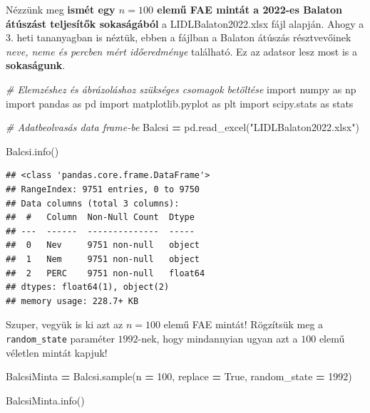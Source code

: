 \documentclass[
]{book}
\newenvironment{Shaded}{\begin{snugshade}}{\end{snugshade}}
\newcommand{\CommentTok}[1]{\textcolor[rgb]{0.56,0.35,0.01}{\textit{#1}}}
\newcommand{\DecValTok}[1]{\textcolor[rgb]{0.00,0.00,0.81}{#1}}
\newcommand{\ImportTok}[1]{#1}
\newcommand{\NormalTok}[1]{#1}
\newcommand{\OperatorTok}[1]{\textcolor[rgb]{0.81,0.36,0.00}{\textbf{#1}}}
\newcommand{\StringTok}[1]{\textcolor[rgb]{0.31,0.60,0.02}{#1}}
\newcommand{\VariableTok}[1]{\textcolor[rgb]{0.00,0.00,0.00}{#1}}
\begin{document}
Nézzünk meg \textbf{ismét egy \(n=100\) elemű FAE mintát a 2022-es Balaton átúszást teljesítők sokaságából} a LIDLBalaton2022.xlsx fájl alapján.
Ahogy a 3. heti tananyagban is néztük, ebben a fájlban a Balaton átúszás résztvevőinek \emph{neve, neme és percben mért időeredménye} található. Ez az adatsor lesz most is a \textbf{sokaságunk}.

\begin{Shaded}
\begin{Highlighting}[]
\CommentTok{\# Elemzéshez és ábrázoláshoz szükséges csomagok betöltése}
\ImportTok{import}\NormalTok{ numpy }\ImportTok{as}\NormalTok{ np}
\ImportTok{import}\NormalTok{ pandas }\ImportTok{as}\NormalTok{ pd}
\ImportTok{import}\NormalTok{ matplotlib.pyplot }\ImportTok{as}\NormalTok{ plt}
\ImportTok{import}\NormalTok{ scipy.stats }\ImportTok{as}\NormalTok{ stats}

\CommentTok{\# Adatbeolvasás data frame{-}be}
\NormalTok{Balcsi }\OperatorTok{=}\NormalTok{ pd.read\_excel(}\StringTok{"LIDLBalaton2022.xlsx"}\NormalTok{)}

\NormalTok{Balcsi.info()}
\end{Highlighting}
\end{Shaded}

\begin{verbatim}
## <class 'pandas.core.frame.DataFrame'>
## RangeIndex: 9751 entries, 0 to 9750
## Data columns (total 3 columns):
##  #   Column  Non-Null Count  Dtype  
## ---  ------  --------------  -----  
##  0   Nev     9751 non-null   object 
##  1   Nem     9751 non-null   object 
##  2   PERC    9751 non-null   float64
## dtypes: float64(1), object(2)
## memory usage: 228.7+ KB
\end{verbatim}

Szuper, vegyük is ki azt az \(n=100\) elemű FAE mintát! Rögzítsük meg a \texttt{random\_state} paraméter \(1992\)-nek, hogy mindannyian ugyan azt a \(100\) elemű véletlen mintát kapjuk!

\begin{Shaded}
\begin{Highlighting}[]
\NormalTok{BalcsiMinta }\OperatorTok{=}\NormalTok{ Balcsi.sample(n }\OperatorTok{=} \DecValTok{100}\NormalTok{, replace }\OperatorTok{=} \VariableTok{True}\NormalTok{, random\_state }\OperatorTok{=} \DecValTok{1992}\NormalTok{)}

\NormalTok{BalcsiMinta.info()}
\end{Highlighting}
\end{Shaded}
\end{document}
